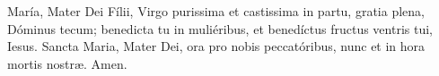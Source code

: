 María, Mater Dei Fílii, Virgo purissima et castissima in partu, gratia plena, Dóminus tecum; benedicta tu in muliéribus, 
et benedíctus fructus ventris tui, Iesus. Sancta Maria, Mater Dei, ora pro nobis peccatóribus, nunc et in hora mortis nostr{\ae}. Amen.